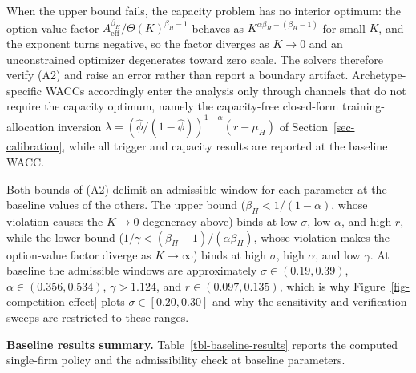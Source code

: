 \documentclass[
  11pt,
  letterpaper,
]{scrartcl}
\begin{document}
When the upper bound fails, the capacity problem has no interior
optimum: the option-value factor
\(A_{\text{eff}}^{\beta_H} / \Theta(K)^{\beta_H - 1}\) behaves as
\(K^{\alpha\beta_H - (\beta_H - 1)}\) for small \(K\), and the exponent
turns negative, so the factor diverges as \(K \to 0\) and an
unconstrained optimizer degenerates toward zero scale. The solvers
therefore verify (A2) and raise an error rather than report a boundary
artifact. Archetype-specific WACCs accordingly enter the analysis only
through channels that do not require the capacity optimum, namely the
capacity-free closed-form training-allocation inversion
\(\lambda = (\hat{\phi}/(1-\hat{\phi}))^{1-\alpha}(r - \mu_H)\) of
Section~\ref{sec-calibration}, while all trigger and capacity results
are reported at the baseline WACC.

Both bounds of (A2) delimit an admissible window for each parameter at
the baseline values of the others. The upper bound
(\(\beta_H < 1/(1-\alpha)\), whose violation causes the \(K \to 0\)
degeneracy above) binds at low \(\sigma\), low \(\alpha\), and high
\(r\), while the lower bound
(\(1/\gamma < (\beta_H-1)/(\alpha\beta_H)\), whose violation makes the
option-value factor diverge as \(K \to \infty\)) binds at high
\(\sigma\), high \(\alpha\), and low \(\gamma\). At baseline the
admissible windows are approximately \(\sigma \in (0.19, 0.39)\),
\(\alpha \in (0.356, 0.534)\), \(\gamma > 1.124\), and
\(r \in (0.097, 0.135)\), which is why
Figure~\ref{fig-competition-effect} plots \(\sigma \in [0.20, 0.30]\)
and why the sensitivity and verification sweeps are restricted to these
ranges.

\newpage

\textbf{Baseline results summary.} Table~\ref{tbl-baseline-results}
reports the computed single-firm policy and the admissibility check at
baseline parameters.
\end{document}
